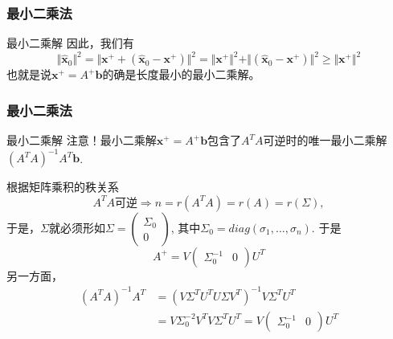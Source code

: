 
\begin{frame}
\frametitle{最小二乘法}

\begin{block}{最小二乘解}
因此，我们有
$$\Vert \widehat{\mathbf{x}}_0 \Vert^2 = \Vert \mathbf{x}^+ + (\widehat{\mathbf{x}}_0 - \mathbf{x}^+) \Vert^2 = \Vert \mathbf{x}^+ \Vert^2 + \Vert (\widehat{\mathbf{x}}_0 - \mathbf{x}^+) \Vert^2 \geqslant \Vert \mathbf{x}^+ \Vert^2$$
也就是说$\mathbf{x}^+ = A^+\mathbf{b}$的确是长度最小的最小二乘解。
\end{block}

\end{frame}


\begin{frame}
\frametitle{最小二乘法}

\begin{block}{最小二乘解}
{\color{red}注意}！最小二乘解$\mathbf{x}^+ = A^+\mathbf{b}$包含了$A^TA$可逆时的唯一最小二乘解$(A^TA)^{-1}A^T\mathbf{b}$.

\vspace{1em}
\pause

根据矩阵乘积的秩关系
$$A^TA\text{可逆} \Longrightarrow n = r(A^TA) = r(A) = r(\Sigma),$$
于是，$\Sigma$就必须形如$\Sigma = \begin{pmatrix} \Sigma_0 \\ 0 \end{pmatrix}$, 其中$\Sigma_0 = diag(\sigma_1, \ldots, \sigma_n)$. 于是
$$A^+ = V\begin{pmatrix} \Sigma_0^{-1} & 0 \end{pmatrix} U^T$$
另一方面，
\begin{align*}
(A^TA)^{-1}A^T & = (V\Sigma^TU^TU\Sigma V^T)^{-1} V\Sigma^TU^T \\
& = V \Sigma_0^{-2} V^T V\Sigma^TU^T = V\begin{pmatrix} \Sigma_0^{-1} & 0 \end{pmatrix} U^T
\end{align*}
\end{block}

\end{frame}



